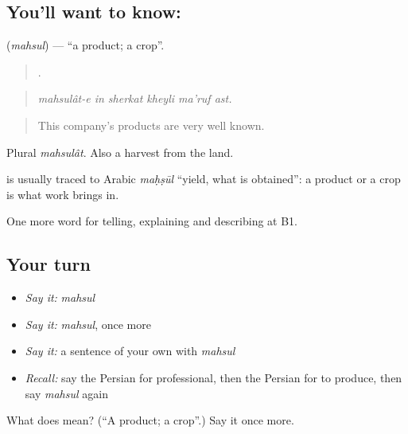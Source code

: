 \subsection*{You'll want to know: }
\textbf{} (\emph{mahsul}) — \textquotedblleft{}a product; a crop\textquotedblright{}.

\begin{quote}
     .
\end{quote}

\begin{quote}
\emph{mahsulât-e in sherkat kheyli ma'ruf ast.}
\end{quote}

\begin{quote}
This company's products are very well known.
\end{quote}

Plural \emph{mahsulât}. Also a harvest from the land.

\begin{cousinweb}
\textbf{} is usually traced to Arabic \emph{maḥṣūl} \textquotedblleft{}yield, what is obtained\textquotedblright{}: a product or a crop is what work brings in.
\end{cousinweb}

\begin{grammarlens}[title={What you've built}]
One more word for telling, explaining and describing at B1.
\end{grammarlens}

\subsection*{Your turn}
\begin{itemize}
\raggedright
  \item \emph{Say it:} \emph{mahsul}
  \item \emph{Say it:} \emph{mahsul}, once more
  \item \emph{Say it:} a sentence of your own with \emph{mahsul}
  \item \emph{Recall:} say the Persian for professional, then the Persian for to produce, then say \emph{mahsul} again
\end{itemize}

\begin{tcolorbox}[breakable,colback=teal!4,colframe=teal!35!black,title={Before you move on}]
What does  mean? (\textquotedblleft{}A product; a crop\textquotedblright{}.) Say it once more.
\end{tcolorbox}
